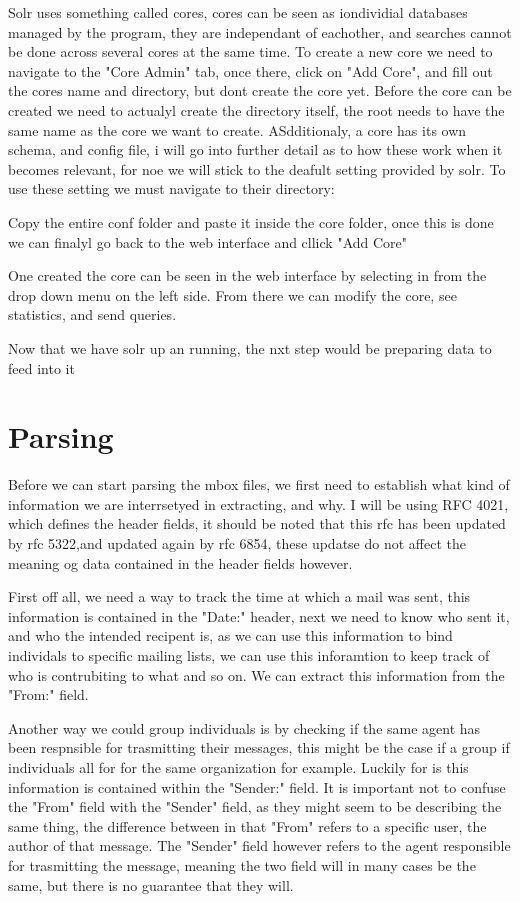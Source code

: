 \documentclass{report}
\begin{document}
Solr uses something called cores, cores can be seen as iondividial databases managed by the program, they are independant of eachother, and searches cannot be done across several cores at the same time.
To create a new core we need to navigate to the "Core Admin" tab, once there, click on "Add Core", and fill out the cores name and directory, but dont create the core yet.
Before the core can be created we need to actualyl create the directory itself, the root needs to have the same name as the core we want to create.
ASdditionaly, a core has its own schema, and config file, i will go into further detail as to how these work when it becomes relevant, for noe we will stick to the deafult setting provided by solr.
To use these setting we must navigate to their directory:


Copy the entire conf folder and paste it inside the core folder, once this is done we can finalyl go back to the web interface and cllick "Add Core" 
 
One created the core can be seen in the web interface by selecting in from the drop down menu on the left side. From there we can modify the core, see statistics, and send queries.

Now that we have solr up an running, the nxt step would be preparing data to feed into it 


\chapter{Parsing}
Before we can start parsing the mbox files, we first need to establish what kind of information we are interrsetyed in extracting, and why.
I will be using RFC 4021, which defines the header fields, it should be noted that this rfc has been updated by rfc 5322,and updated again by rfc 6854, these updatse do not affect the meaning og data contained in the header fields however.

First off all, we need a way to track the time at which a mail was sent, this information is contained in the "Date:" header, next we need to know who sent it, and who the intended recipent is, 
as we can use this information to bind individals to specific mailing lists, we can use this inforamtion to keep track of who is contrubiting to what and so on.
We can extract this information from the "From:" field.

Another way we could group individuals is by checking if the same agent has been respnsible for trasmitting their messages, this might be the case if a group if individuals all for for the same organization for example. Luckily for is this information is contained within the "Sender:" field.
It is important not to confuse the "From" field with the "Sender" field, as they might seem to be describing the same thing, the difference between in that "From" refers to a specific user,
the author of that message. The "Sender" field however refers to the agent responsible for trasmitting the message, meaning the two field will in many cases be the same, but there is no guarantee that they will.
\end{document}

